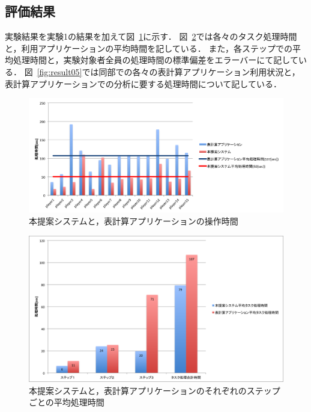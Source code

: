 \documentclass[sotsuron]{kuee}
\begin{document}
		\subsection{評価結果}
			実験結果を実験1の結果を加えて図~\ref{fig:result03}に示す．
			図~\ref{fig:result04}では各々のタスク処理時間と，利用アプリケーションの平均時間を記している．
			また，各ステップでの平均処理時間と，実験対象者全員の処理時間の標準偏差をエラーバーにて記している．
			図~\ref{fig:result05}では同部での各々の表計算アプリケーション利用状況と，表計算アプリケーションでの分析に要する処理時間について記している．
			\begin{figure}
				\begin{center}
					\includegraphics[width=\linewidth]{./png/result03.png}
				\end{center}
				\caption{本提案システムと，表計算アプリケーションの操作時間}
		  		\label{fig:result03}
			\end{figure}
			\begin{figure}
				\begin{center}
					\includegraphics[width=\linewidth]{./png/result04.png}
				\end{center}
				\caption{本提案システムと，表計算アプリケーションのそれぞれのステップごとの平均処理時間}
		  		\label{fig:result04}
			\end{figure}
\end{document}
